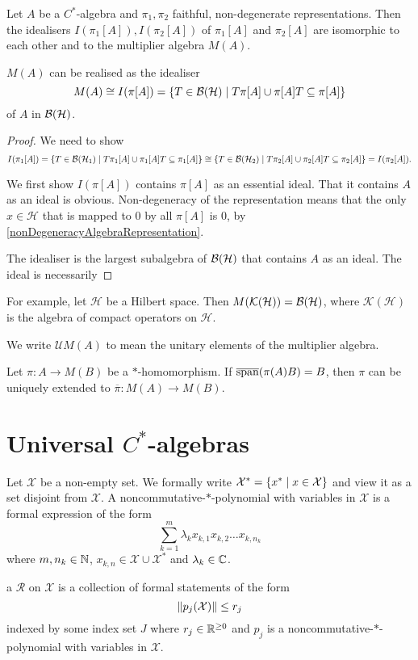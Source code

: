 \begin{proposition}
Let $A$ be a $C^*$-algebra and $\pi_1, \pi_2$ faithful, non-degenerate representations. Then the idealisers $I(\pi_1[A]), I(\pi_2[A])$ of $\pi_1[A]$ and $\pi_2[A]$ are isomorphic to each other and to the multiplier algebra $M(A)$.


$M(A)$ can be realised as the idealiser
\[ M(A) \cong I(\pi[A]) = \left\{ T\in \operatorname{\mathcal{B}}(\mathcal{H}) \;\middle|\; T\pi[A] \cup \pi[A]T \subseteq \pi[A] \right\} \]
of $A$ in $\operatorname{\mathcal{B}}(\mathcal{H})$.
\end{proposition}
\begin{proof}
We need to show
\[ I(\pi_1[A]) = \left\{ T\in \operatorname{\mathcal{B}}(\mathcal{H}_1) \;\middle|\; T\pi_1[A] \cup \pi_1[A]T \subseteq \pi_1[A] \right\} \cong \left\{ T\in \operatorname{\mathcal{B}}(\mathcal{H}_2) \;\middle|\; T\pi_2[A] \cup \pi_2[A]T \subseteq \pi_2[A] \right\} = I(\pi_2[A]). \]

We first show $I(\pi[A])$ contains $\pi[A]$ as an essential ideal. That it contains $A$ as an ideal is obvious. Non-degeneracy of the representation means that the only $x\in\mathcal{H}$ that is mapped to $0$ by all $\pi[A]$ is $0$, by \ref{nonDegeneracyAlgebraRepresentation}. 

The idealiser is the largest subalgebra of $\operatorname{\mathcal{B}}(\mathcal{H})$ that contains $A$ as an ideal. The ideal is necessarily 
\end{proof}

For example, let $\mathcal{H}$ be a Hilbert space. Then $M(\mathcal{K}(\mathcal{H})) = \operatorname{\mathcal{B}}(\mathcal{H})$, where $\mathcal{K}(\mathcal{H})$ is the algebra of compact operators on $\mathcal{H}$.

We write $\mathcal{U}M(A)$ to mean the unitary elements of the multiplier algebra.

Let $\pi: A\to M(B)$ be a $*$-homomorphism. If $\overline{\operatorname{span}}(\pi(A)B) = B$, then $\pi$ can be uniquely extended to $\overline{\pi}: M(A) \to M(B)$. 

\section{Universal $C^*$-algebras}
\begin{definition}
Let $\mathcal{X}$ be a non-empty set. We formally write $\mathcal{X}^* = \left\{ x^* \;\middle|\; x\in \mathcal{X} \right\}$ and view it as a set disjoint from $\mathcal{X}$. A noncommutative-$*$-polynomial with variables in $\mathcal{X}$ is a formal expression of the form
\[ \sum_{k=1}^m\lambda_k x_{k,1}x_{k,2}\ldots x_{k,n_k} \]
where $m, n_k\in \mathbb{N}$, $x_{k,n}\in \mathcal{X}\cup\mathcal{X}^*$ and $\lambda_k\in \mathbb{C}$.

a  $\mathcal{R}$ on $\mathcal{X}$ is a collection of formal statements of the form
\[ \lVert p_j(\mathcal{X})\rVert\leq r_j \]
indexed by some index set $J$ where $r_j \in\mathbb{R}^{\geq 0}$ and $p_j$ is a noncommutative-$*$-polynomial with variables in $\mathcal{X}$.
\end{definition}


